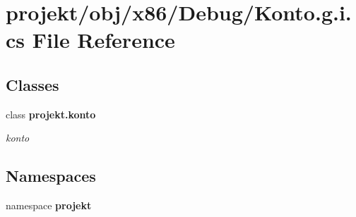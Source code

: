 \section{projekt/obj/x86/\+Debug/\+Konto.g.\+i.\+cs File Reference}
\label{Konto_8g_8i_8cs}
\subsection*{Classes}
\begin{DoxyCompactItemize}
\item 
class \textbf{ projekt.\+konto}
\begin{DoxyCompactList}\small\item\em konto \end{DoxyCompactList}\end{DoxyCompactItemize}
\subsection*{Namespaces}
\begin{DoxyCompactItemize}
\item 
namespace \textbf{ projekt}
\end{DoxyCompactItemize}
